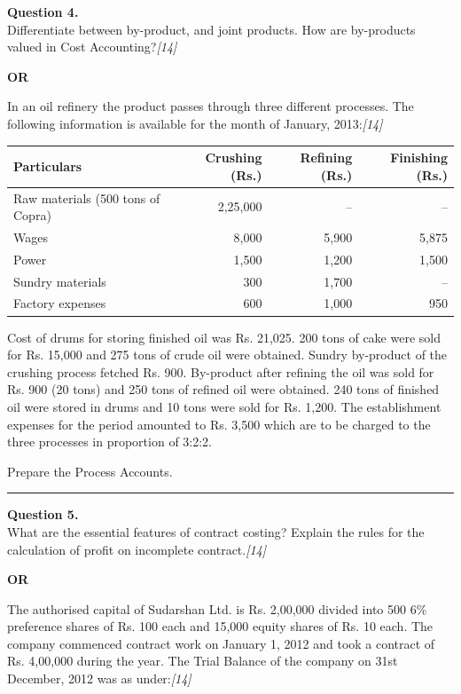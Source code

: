 \documentclass[11pt,a4paper]{article}
\newcommand{\pts}[1]{\hfill   \textit{[#1]}}
\begin{document}
\noindent   \textbf{Question 4.} \\
Differentiate between by-product, and joint products. How are by-products valued in Cost Accounting?\pts{14}

\centerline{   \textbf{OR}}

In an oil refinery the product passes through three different processes. The following information is available for the month of January, 2013:\pts{14}

\begin{center}
\renewcommand{\arraystretch}{1.2}

\begin{tabular}{|l|r|r|r|}
\hline
   \textbf{Particulars} &   \textbf{Crushing (Rs.)} &   \textbf{Refining (Rs.)} &   \textbf{Finishing (Rs.)} \\ \hline
Raw materials (500 tons of Copra) & 2,25,000 & -- & -- \\
Wages & 8,000 & 5,900 & 5,875 \\
Power & 1,500 & 1,200 & 1,500 \\
Sundry materials & 300 & 1,700 & -- \\
Factory expenses & 600 & 1,000 & 950 \\ \hline
\end{tabular}
\end{center}
Cost of drums for storing finished oil was Rs. 21,025. 200 tons of cake were sold for Rs. 15,000 and 275 tons of crude oil were obtained. Sundry by-product of the crushing process fetched Rs. 900. By-product after refining the oil was sold for Rs. 900 (20 tons) and 250 tons of refined oil were obtained. 240 tons of finished oil were stored in drums and 10 tons were sold for Rs. 1,200. The establishment expenses for the period amounted to Rs. 3,500 which are to be charged to the three processes in proportion of 3:2:2.

Prepare the Process Accounts.

\medskip\rule{\linewidth}{0.2pt}




\noindent   \textbf{Question 5.} \\
What are the essential features of contract costing? Explain the rules for the calculation of profit on incomplete contract.\pts{14}

\centerline{   \textbf{OR}}

The authorised capital of Sudarshan Ltd. is Rs. 2,00,000 divided into 500 6\% preference shares of Rs. 100 each and 15,000 equity shares of Rs. 10 each. The company commenced contract work on January 1, 2012 and took a contract of Rs. 4,00,000 during the year. The Trial Balance of the company on 31st December, 2012 was as under:\pts{14}
\end{document}
